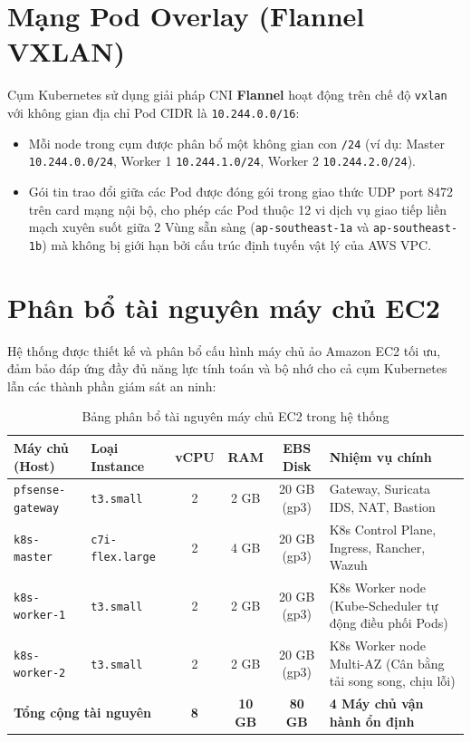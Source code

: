 \section{Mạng Pod Overlay (Flannel VXLAN)}
Cụm Kubernetes sử dụng giải pháp CNI \textbf{Flannel} hoạt động trên chế độ \texttt{vxlan} với không gian địa chỉ Pod CIDR là \texttt{10.244.0.0/16}:
\begin{itemize}
    \item Mỗi node trong cụm được phân bổ một không gian con \texttt{/24} (ví dụ: Master \texttt{10.244.0.0/24}, Worker 1 \texttt{10.244.1.0/24}, Worker 2 \texttt{10.244.2.0/24}).
    \item Gói tin trao đổi giữa các Pod được đóng gói trong giao thức UDP port 8472 trên card mạng nội bộ, cho phép các Pod thuộc 12 vi dịch vụ giao tiếp liền mạch xuyên suốt giữa 2 Vùng sẵn sàng (\texttt{ap-southeast-1a} và \texttt{ap-southeast-1b}) mà không bị giới hạn bởi cấu trúc định tuyến vật lý của AWS VPC.
\end{itemize}

\section{Phân bổ tài nguyên máy chủ EC2}
Hệ thống được thiết kế và phân bổ cấu hình máy chủ ảo Amazon EC2 tối ưu, đảm bảo đáp ứng đầy đủ năng lực tính toán và bộ nhớ cho cả cụm Kubernetes lẫn các thành phần giám sát an ninh:

\begin{table}[H]
    \centering
    \small
    \renewcommand{\arraystretch}{1.25}
    \caption{Bảng phân bổ tài nguyên máy chủ EC2 trong hệ thống}
    \label{tab:ec2_resources}
    \begin{tabularx}{\textwidth}{l l c c c X}
        \toprule
        \textbf{Máy chủ (Host)} & \textbf{Loại Instance} & \textbf{vCPU} & \textbf{RAM} & \textbf{EBS Disk} & \textbf{Nhiệm vụ chính} \\
        \midrule
        \texttt{pfsense-gateway} & \texttt{t3.small} & 2 & 2 GB & 20 GB (gp3) & Gateway, Suricata IDS, NAT, Bastion \\
        \texttt{k8s-master} & \texttt{c7i-flex.large} & 2 & 4 GB & 20 GB (gp3) & K8s Control Plane, Ingress, Rancher, Wazuh \\
        \texttt{k8s-worker-1} & \texttt{t3.small} & 2 & 2 GB & 20 GB (gp3) & K8s Worker node (Kube-Scheduler tự động điều phối Pods) \\
        \texttt{k8s-worker-2} & \texttt{t3.small} & 2 & 2 GB & 20 GB (gp3) & K8s Worker node Multi-AZ (Cân bằng tải song song, chịu lỗi) \\
        \midrule
        \multicolumn{2}{l}{\textbf{Tổng cộng tài nguyên}} & \textbf{8} & \textbf{10 GB} & \textbf{80 GB} & \textbf{4 Máy chủ vận hành ổn định} \\
        \bottomrule
    \end{tabularx}
\end{table}
